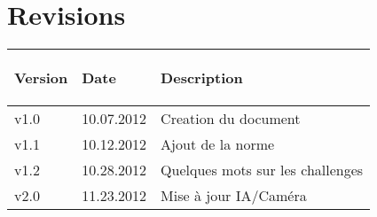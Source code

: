 \part*{Revisions}

%
%

\begin{tabular}{|p{2cm}|p{2cm}|p{6cm}|}
	\hline
		\rowcolor{table_header_color} 
		\begin{bf}Version\end{bf} & \begin{bf}Date\end{bf} & \begin{bf}Description\end{bf} \\
	\hline
		v1.0 & 10.07.2012 & Creation du document \\
	\hline
		v1.1 & 10.12.2012 & Ajout de la norme \\
	\hline
		v1.2 & 10.28.2012 & Quelques mots sur les challenges \\
	\hline
		v2.0 & 11.23.2012 & Mise à jour IA/Caméra \\
	\hline
\end{tabular}